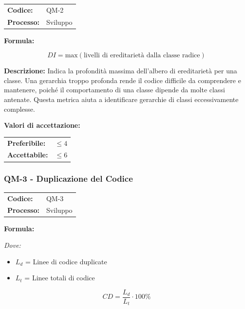 \documentclass[a4paper,11pt,oneside]{scrartcl}
\begin{document}
\noindent
\begin{tabular}{@{}p{}p{}@{}}
\textbf{Codice:} & QM-2 \\
\textbf{Processo:} & Sviluppo \\
\end{tabular}

\vspace{0.3cm}
\noindent\textbf{Formula:}

\[
DI = \text{max}(\text{livelli di ereditarietà dalla classe radice})
\]

\noindent\textbf{Descrizione:} Indica la profondità massima dell'albero di ereditarietà per una classe. Una gerarchia troppo profonda rende il codice difficile da comprendere e mantenere, poiché il comportamento di una classe dipende da molte classi antenate. Questa metrica aiuta a identificare gerarchie di classi eccessivamente complesse.

\vspace{0.2cm}
\noindent\textbf{Valori di accettazione:}
\vspace{0.1cm}

\noindent
\begin{tabular}{@{}ll@{}}
\textbf{Preferibile:} & $\le 4$ \\
\textbf{Accettabile:} & $\le 6$ \\
\end{tabular}

\subsubsection{QM-3 - Duplicazione del Codice}

\noindent
\begin{tabular}{@{}p{}p{}@{}}
\textbf{Codice:} & QM-3 \\
\textbf{Processo:} & Sviluppo \\
\end{tabular}

\vspace{0.3cm}
\noindent\textbf{Formula:}

\noindent\textit{Dove:}
\begin{itemize}[leftmargin=1.5cm, topsep=0pt, itemsep=0pt]
    \item $L_d$ = Linee di codice duplicate
    \item $L_t$ = Linee totali di codice
\end{itemize}

\[
CD = \frac{L_d}{L_t} \cdot 100\%
\]
\end{document}
